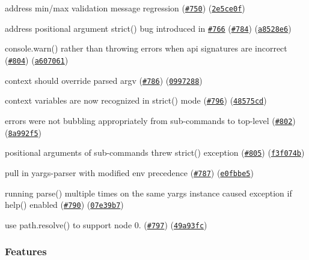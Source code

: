 \begin{DoxyItemize}
\item address min/max validation message regression (\href{https://github.com/yargs/yargs/issues/750}{\tt \#750}) (\href{https://github.com/yargs/yargs/commit/2e5ce0f}{\tt 2e5ce0f})
\item address positional argument strict() bug introduced in \href{https://github.com/yargs/yargs/issues/766}{\tt \#766} (\href{https://github.com/yargs/yargs/issues/784}{\tt \#784}) (\href{https://github.com/yargs/yargs/commit/a8528e6}{\tt a8528e6})
\item console.\+warn() rather than throwing errors when api signatures are incorrect (\href{https://github.com/yargs/yargs/issues/804}{\tt \#804}) (\href{https://github.com/yargs/yargs/commit/a607061}{\tt a607061})
\item context should override parsed argv (\href{https://github.com/yargs/yargs/issues/786}{\tt \#786}) (\href{https://github.com/yargs/yargs/commit/0997288}{\tt 0997288})
\item context variables are now recognized in strict() mode (\href{https://github.com/yargs/yargs/issues/796}{\tt \#796}) (\href{https://github.com/yargs/yargs/commit/48575cd}{\tt 48575cd})
\item errors were not bubbling appropriately from sub-\/commands to top-\/level (\href{https://github.com/yargs/yargs/issues/802}{\tt \#802}) (\href{https://github.com/yargs/yargs/commit/8a992f5}{\tt 8a992f5})
\item positional arguments of sub-\/commands threw strict() exception (\href{https://github.com/yargs/yargs/issues/805}{\tt \#805}) (\href{https://github.com/yargs/yargs/commit/f3f074b}{\tt f3f074b})
\item pull in yargs-\/parser with modified env precedence (\href{https://github.com/yargs/yargs/issues/787}{\tt \#787}) (\href{https://github.com/yargs/yargs/commit/e0fbbe5}{\tt e0fbbe5})
\item running parse() multiple times on the same yargs instance caused exception if help() enabled (\href{https://github.com/yargs/yargs/issues/790}{\tt \#790}) (\href{https://github.com/yargs/yargs/commit/07e39b7}{\tt 07e39b7})
\item use path.\+resolve() to support node 0. (\href{https://github.com/yargs/yargs/issues/797}{\tt \#797}) (\href{https://github.com/yargs/yargs/commit/49a93fc}{\tt 49a93fc})
\end{DoxyItemize}

\subsubsection*{Features}


